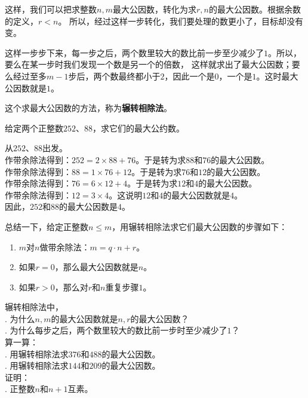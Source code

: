 \documentclass[12pt,UTF8,fontset=none]{ctexbook}
\begin{document}
这样，我们可以把求整数$n,m$最大公因数，转化为求$r,n$的最大公因数。根据余数的定义，$r < n$。
所以，经过这样一步转化，我们要处理的数更小了，目标却没有变。

这样一步步下来，每一步之后，两个数里较大的数比前一步至少减少了$1$。所以，要么在某一步时我们发现一个数是另一个的倍数，
这样就求出了最大公因数；要么经过至多$m-1$步后，两个数最终都小于$2$，因此一个是$0$，一个是$1$。这时最大公因数就是$1$。

这个求最大公因数的方法，称为\textbf{辗转相除法}。

\begin{et}
    给定两个正整数$252$、$88$，求它们的最大公约数。
\end{et}

\begin{so}
    从$252$、$88$出发。\\
    作带余除法得到：$252 = 2 \times 88 + 76$。于是转为求$88$和$76$的最大公因数。\\
    作带余除法得到：$88 = 1 \times 76 + 12$。于是转为求$76$和$12$的最大公因数。\\
    作带余除法得到：$76 = 6 \times 12 + 4$。于是转为求$12$和$4$的最大公因数。\\
    作带余除法得到：$12 = 3 \times 4$。这说明$12$和$4$的最大公因数就是$4$。\\
    因此，$252$和$88$的最大公因数是$4$。
\end{so}

总结一下，给定正整数$n\leqslant m$，用辗转相除法求它们最大公因数的步骤如下：
\begin{enumerate}
    \item $m$对$n$做带余除法：$m = q \cdot n + r$。
    \item 如果$r = 0$，那么最大公因数就是$n$。
    \item 如果$r > 0$，那么对$r$和$n$重复步骤$1$。
\end{enumerate}

\begin{xt}\label{xt:5-1-0}
    辗转相除法中，\\
    . 为什么$n,m$的最大公因数就是$n,r$的最大公因数？\\
    . 为什么每步之后，两个数里较大的数比前一步时至少减少了$1$？\\
    算一算：\\
    . 用辗转相除法求$376$和$488$的最大公因数。\\
    . 用辗转相除法求$144$和$209$的最大公因数。\\
    证明：\\
    . 正整数$n$和$n+1$互素。
\end{xt}
\end{document}
